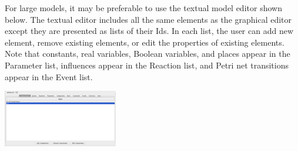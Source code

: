 \documentclass[titlepage,11pt]{article}
\begin{document}
For large models, it may be preferable to use the textual model editor shown below.  The textual editor includes all the same elements as the graphical editor except they are presented as lists of their Ids.  In each list, the user can add new element, remove existing elements, or edit the properties of existing elements.  Note that constants, real variables, Boolean variables, and places appear in the Parameter list, influences appear in the Reaction list, and Petri net transitions appear in the Event list.

\begin{center}
\includegraphics[height=25mm]{screenshots/textualEditor}
\end{center}

\end{document}
